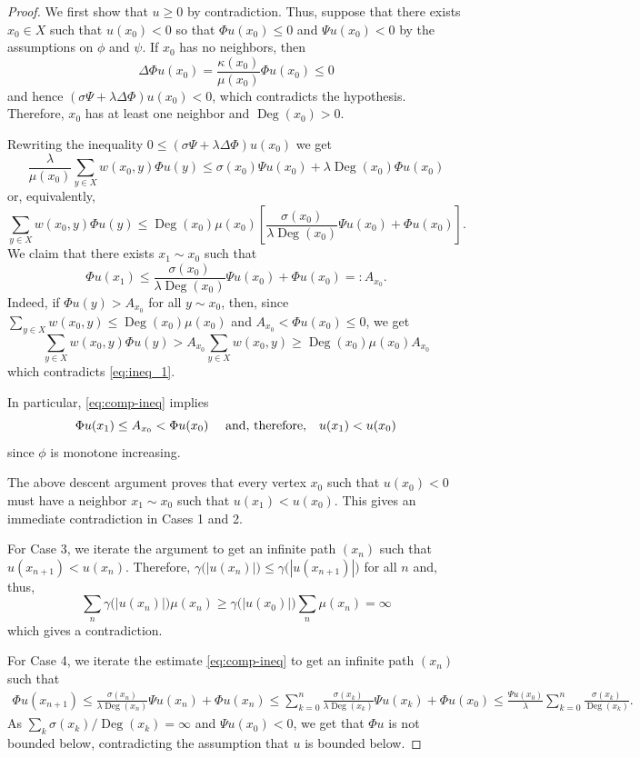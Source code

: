 \documentclass[letterpaper]{article}
\theoremstyle{definition}
\theoremstyle{named}
\numberwithin{equation}{section}
\newcommand{\Deg}{\operatorname{Deg}}
\begin{document}
\begin{proof}
{
We first show that $u\geq0$ by contradiction. Thus, suppose that there exists $x_0\in X$ such that
$u(x_0)<0$ so that $\Phi u(x_0)\leq0$ and $\Psi u(x_0)<0$ by the
assumptions on $\phi$ and $\psi$.
If $x_0$ has no neighbors, then
\[
 \Delta\Phi u(x_0)=\frac{\kappa(x_0)}{\mu(x_0)}\Phi u(x_0)\leq0
\]
and hence $\left(\sigma\Psi+\lambda\Delta\Phi\right)u(x_0)<0$, which
contradicts the hypothesis. Therefore, $x_0$ has at least one neighbor and
$\Deg(x_0)>0$.}

Rewriting the inequality $0 \leq \left( \sigma \Psi + \lambda\Delta \Phi\right)u(x_0)$ we get
\[
\frac{\lambda}{\mu(x_0)} 
\sum_{y \in X} w(x_0,y) \Phi u(y) \leq \sigma(x_0) \Psi u(x_0) + \lambda \Deg(x_0) \Phi u(x_0)
\]
or, equivalently,
\begin{equation}\label{eq:ineq_1}
\sum_{y \in X} w(x_0,y) \Phi u(y) \leq { \Deg(x_0)\mu(x_0)
\left[\frac{\sigma(x_0)}{\lambda \Deg(x_0)} \Psi u(x_0) +  \Phi u(x_0) \right].}
\end{equation}
{ We claim that there exists $x_1\sim x_0$ such that}
\begin{equation}
\label{eq:comp-ineq}
{
\Phi u(x_1) \leq \frac{\sigma(x_0)}{\lambda \Deg(x_0)}\Psi u(x_0) + \Phi u(x_0)=:A_{x_0}.}
\end{equation}
{
Indeed, if $\Phi u(y)>A_{x_0}$
for all $y \sim x_0$, then, since  $\sum_{y \in X} w(x_0,y) \leq \Deg(x_0)\mu(x_0)$
and
$A_{x_0}<\Phi u(x_0)\leq0$, we get
\[
\sum_{y \in X}w(x_0,y) \Phi u(y)> A_{x_0} \sum_{y\in X} w(x_0,y) \geq
\Deg(x_0)\mu(x_0)A_{x_0}
\]
which contradicts \eqref{eq:ineq_1}.}


In particular, \eqref{eq:comp-ineq} implies
{
\[
\Phi u(x_1)\leq A_{x_0} < \Phi u(x_0) \quad \textup{ and, therefore,} \quad u(x_1) < u(x_0)
\]
since $\phi$ is monotone increasing.}

{ The above descent argument proves that every vertex $x_0$ such that
$u(x_0)<0$ must have a neighbor $x_1\sim x_0$ such that $u(x_1)<u(x_0)$.}
This gives an immediate contradiction in Cases 1 and 2.

For Case 3, we iterate the argument to get an infinite path $(x_n)$ such that
$u(x_{n+1}) < u(x_n)$. 
Therefore, 
$\gamma\bigl(|u(x_n)|\bigr)\leq \gamma\bigl(|u(x_{n+1})|\bigr)$ for all $n$ and, thus,
\[
\sum_n \gamma\bigl(|u(x_n)|\bigr) \mu(x_n) \ge \gamma\bigl(|u(x_0)|\bigr) \sum_n \mu(x_n) = \infty
\]
which gives a contradiction.


For Case 4, we iterate the estimate \eqref{eq:comp-ineq} 
to get an infinite path $(x_n)$ such that
\begin{align*}
\Phi u(x_{n+1}) \leq \frac{\sigma(x_n)}{\lambda \Deg(x_n)}\Psi u(x_n) + \Phi u(x_n)
\leq \sum_{k=0}^n\frac{\sigma(x_k)}{\lambda \Deg(x_k)} \Psi u(x_k)+\Phi u(x_0) { \leq }\frac{\Psi u(x_0)}{\lambda} \sum_{k=0}^n \frac{\sigma(x_k)}{\Deg(x_k)}.
\end{align*}
As $\sum_k \sigma(x_k)/\Deg(x_k) = \infty$ and $\Psi u(x_0)<0$, we get that $\Phi u$
is not bounded below, contradicting the assumption that $u$ is bounded below.


\end{proof}
\end{document}
